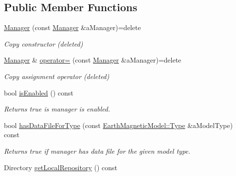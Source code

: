 \subsection*{Public Member Functions}
\begin{DoxyCompactItemize}
\item 
\hyperlink{classlibrary_1_1physics_1_1environment_1_1magnetic_1_1earth_1_1_manager_a8487bb588deb7bb2c9b3fa1a5a59b422}{Manager} (const \hyperlink{classlibrary_1_1physics_1_1environment_1_1magnetic_1_1earth_1_1_manager}{Manager} \&a\+Manager)=delete
\begin{DoxyCompactList}\small\item\em Copy constructor (deleted) \end{DoxyCompactList}\item 
\hyperlink{classlibrary_1_1physics_1_1environment_1_1magnetic_1_1earth_1_1_manager}{Manager} \& \hyperlink{classlibrary_1_1physics_1_1environment_1_1magnetic_1_1earth_1_1_manager_a1f9e25590f17e9a58d8b4948f290e255}{operator=} (const \hyperlink{classlibrary_1_1physics_1_1environment_1_1magnetic_1_1earth_1_1_manager}{Manager} \&a\+Manager)=delete
\begin{DoxyCompactList}\small\item\em Copy assignment operator (deleted) \end{DoxyCompactList}\item 
bool \hyperlink{classlibrary_1_1physics_1_1environment_1_1magnetic_1_1earth_1_1_manager_a0b238ac6a27372ef08a87eb72fae0ba0}{is\+Enabled} () const
\begin{DoxyCompactList}\small\item\em Returns true is manager is enabled. \end{DoxyCompactList}\item 
bool \hyperlink{classlibrary_1_1physics_1_1environment_1_1magnetic_1_1earth_1_1_manager_ad163496bf42eb8acabbafcb3c2cb6f05}{has\+Data\+File\+For\+Type} (const \hyperlink{classlibrary_1_1physics_1_1environment_1_1magnetic_1_1_earth_ab9d257d23aa5899a3ef36c7dec62ef72}{Earth\+Magnetic\+Model\+::\+Type} \&a\+Model\+Type) const
\begin{DoxyCompactList}\small\item\em Returns true if manager has data file for the given model type. \end{DoxyCompactList}\item 
Directory \hyperlink{classlibrary_1_1physics_1_1environment_1_1magnetic_1_1earth_1_1_manager_a39ef95997e959ff2d74e3b8c4ac8ff7d}{get\+Local\+Repository} () const

\end{DoxyCompactItemize}
